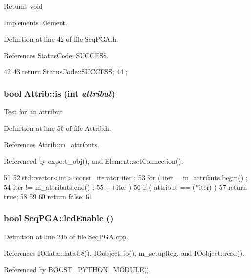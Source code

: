 \begin{DoxyReturn}{Returns}
void 
\end{DoxyReturn}


Implements \hyperlink{classElement_af42754b5cabc198869222725218d695c}{Element}.

Definition at line 42 of file SeqPGA.h.

References StatusCode::SUCCESS.


\begin{DoxyCode}
42                     {
43     return StatusCode::SUCCESS;
44   };
\end{DoxyCode}
\hypertarget{classAttrib_a704f26af560909ad22065083bb7d4c34}{
\subsubsection[{is}]{\setlength{\rightskip}{0pt plus 5cm}bool Attrib::is (int {\em attribut})}}
\label{classAttrib_a704f26af560909ad22065083bb7d4c34}
Test for an attribut 

Definition at line 50 of file Attrib.h.

References Attrib::m\_\-attributs.

Referenced by export\_\-obj(), and Element::setConnection().


\begin{DoxyCode}
51   {
52     std::vector<int>::const_iterator iter ;
53     for ( iter  = m_attributs.begin() ;
54           iter != m_attributs.end()   ;
55           ++iter ) {
56       if ( attribut == (*iter) ) {
57         return true;
58       }
59     }
60     return false;
61   }
\end{DoxyCode}
\hypertarget{classSeqPGA_a45ec726e141bfef3fa59c4b2d36a0657}{
\subsubsection[{ledEnable}]{\setlength{\rightskip}{0pt plus 5cm}bool SeqPGA::ledEnable ()}}
\label{classSeqPGA_a45ec726e141bfef3fa59c4b2d36a0657}


Definition at line 215 of file SeqPGA.cpp.

References IOdata::dataU8(), IOobject::io(), m\_\-setupReg, and IOobject::read().

Referenced by BOOST\_\-PYTHON\_\-MODULE().


